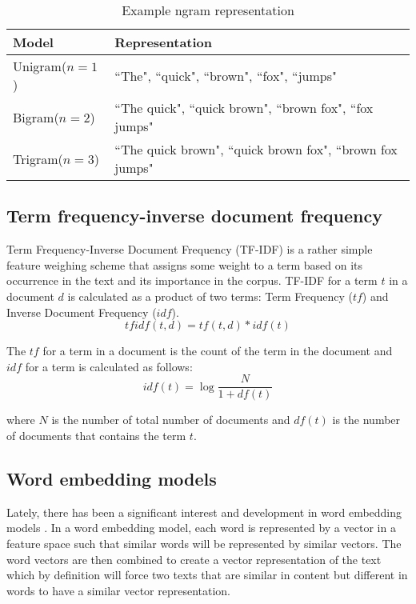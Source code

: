 \begin{table}[h]
\begin{center}
\caption{Example ngram representation}
\label{tbl:ngram_representation}
\begin{tabular}{p{3cm}p{8cm}}
\toprule 
Model&Representation\\
\midrule 
Unigram($n=1$)& ``The", ``quick", ``brown", ``fox", ``jumps" \\
Bigram($n=2$)& ``The quick", ``quick brown", ``brown fox", ``fox jumps" \\
Trigram($n=3$)& ``The quick brown", ``quick brown fox", ``brown fox jumps" \\
\bottomrule
\end{tabular}
\end{center}
\end{table}

\subsection{Term frequency-inverse document frequency}
Term Frequency-Inverse Document Frequency (TF-IDF)\cite{sparck1972statistical} is a rather simple feature weighing scheme that assigns some weight to a term based on its occurrence in the text and its importance in the corpus. TF-IDF for a term $t$ in a document $d$ is calculated as a product of two terms: Term Frequency ($tf$) and Inverse Document Frequency ($idf$). 
\begin{equation}
    \label{eq:tf_idf_equation}
    tfidf(t, d) = tf(t, d) * idf(t)
\end{equation}

The $tf$ for a term in a document is the count of the term in the document and $idf$ for a term is calculated as follows:
\begin{equation}
    \label{eq:idf_equation}
    idf(t) = \log{\frac{N}{1 + df(t)}}
\end{equation}

\noindent
where $N$ is the number of total number of documents and $df(t)$ is the number of documents that contains the term $t$.

\subsection{Word embedding models}
Lately, there has been a significant interest and development in word embedding models \cite{mikolov2013distributed, pennington2014glove, bojanowski2017enriching}. In a word embedding model, each word is represented by a vector in a feature space such that similar words will be represented by similar vectors\cite{mikolov2013distributed}. The word vectors are then combined to create a vector representation of the text which by definition will force two texts that are similar in content but different in words to have a similar vector representation.

